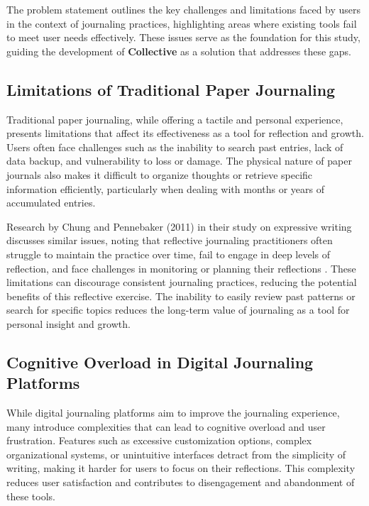 The problem statement outlines the key challenges and limitations faced by users in the context of journaling practices, highlighting areas where existing tools fail to meet user needs effectively. These issues serve as the foundation for this study, guiding the development of \textbf{Collective} as a solution that addresses these gaps.

\subsection{Limitations of Traditional Paper Journaling}\label{subsec:traditional-limits}

Traditional paper journaling, while offering a tactile and personal experience, presents limitations that affect its effectiveness as a tool for reflection and growth. Users often face challenges such as the inability to search past entries, lack of data backup, and vulnerability to loss or damage. The physical nature of paper journals also makes it difficult to organize thoughts or retrieve specific information efficiently, particularly when dealing with months or years of accumulated entries.

Research by Chung and Pennebaker (2011) in their study on expressive writing discusses similar issues, noting that reflective journaling practitioners often struggle to maintain the practice over time, fail to engage in deep levels of reflection, and face challenges in monitoring or planning their reflections \cite{chung2011expressive}. These limitations can discourage consistent journaling practices, reducing the potential benefits of this reflective exercise. The inability to easily review past patterns or search for specific topics reduces the long-term value of journaling as a tool for personal insight and growth.

\subsection{Cognitive Overload in Digital Journaling Platforms}\label{subsec:cognitive-overload}

While digital journaling platforms aim to improve the journaling experience, many introduce complexities that can lead to cognitive overload and user frustration. Features such as excessive customization options, complex organizational systems, or unintuitive interfaces detract from the simplicity of writing, making it harder for users to focus on their reflections. This complexity reduces user satisfaction and contributes to disengagement and abandonment of these tools.

